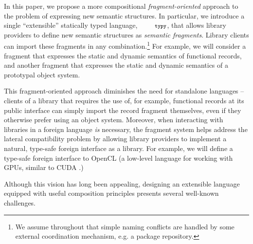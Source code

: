 \documentclass[10pt]{sigplanconf}
\newcommand{\typy}{\texttt{\footnotesize typy}}
\begin{document}
In this paper, we propose a more compositional \emph{fragment-oriented} approach to the problem of expressing new semantic structures. In particular, we introduce a 
single ``extensible'' statically typed language, $\typy$, that allows library providers to define new semantic structures as \emph{semantic fragments}. Library clients can import these fragments in any combination.\footnote{We assume throughout that simple naming conflicts are handled by some external coordination mechanism, e.g. a package repository.} %
For example, we will consider a fragment that expresses the static and dynamic semantics of functional records, and another fragment that expresses the static and dynamic semantics of a prototypal object system.

This fragment-oriented approach diminishes the need for standalone languages -- clients of a library that requires the use of, for example, functional records at its public interface can simply import the record fragment themselves, even if they otherwise prefer using an object system. %
Moreover, when interacting with libraries in a foreign language \emph{is} necessary, the fragment system helps address the lateral compatibility problem by allowing library providers to implement a natural, type-safe foreign interface as a library. For example, we will define a type-safe foreign interface to OpenCL (a low-level language for working with GPUs, similar to CUDA \cite{klockner2011pycuda}.)

Although this vision has long been appealing, designing an {extensible language} equipped with useful composition principles presents several well-known challenges.

\end{document}
